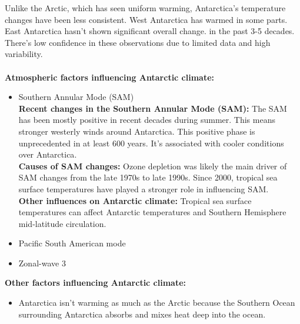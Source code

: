 Unlike the Arctic, which has seen uniform warming, Antarctica's temperature changes have been less consistent. West Antarctica has warmed in some parts. East Antarctica hasn't shown significant overall change. in the past 3-5 decades. There's low confidence in these observations due to limited data and high variability\cite{O_C_in_changingClimate}. \\\\
\textbf{Atmospheric factors influencing Antarctic climate:}
\begin{itemize}
\item Southern Annular Mode (SAM)\\
    \textbf{Recent changes in the Southern Annular Mode (SAM):} The SAM has been mostly positive in recent decades during summer. This means stronger westerly winds around Antarctica. This positive phase is unprecedented in at least 600 years. It's associated with cooler conditions over Antarctica\cite{O_C_in_changingClimate}.\\
    \textbf{Causes of SAM changes:} Ozone depletion was likely the main driver of SAM changes from the late 1970s to late 1990s. Since 2000, tropical sea surface temperatures have played a stronger role in influencing SAM\cite{O_C_in_changingClimate}.\\
    \textbf{Other influences on Antarctic climate:} Tropical sea surface temperatures can affect Antarctic temperatures and Southern Hemisphere mid-latitude circulation\cite{JACOBS_2004}.
\item Pacific South American mode
\item Zonal-wave 3
\end{itemize}

\textbf{Other factors influencing Antarctic climate:}
\begin{itemize}
\item Antarctica isn't warming as much as the Arctic because the Southern Ocean surrounding Antarctica absorbs and mixes heat deep into the ocean\cite{L_T_C_C}.
\end{itemize}